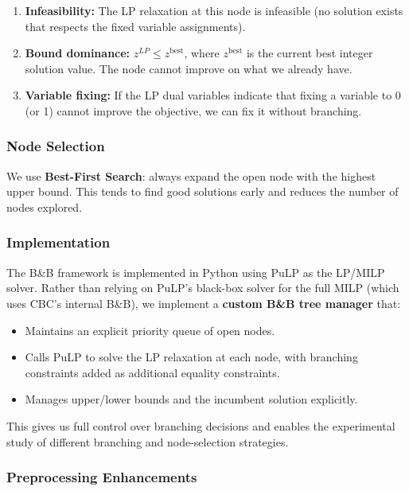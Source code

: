 \documentclass[12pt,a4paper]{article}
\begin{document}
\begin{enumerate}
  \item \textbf{Infeasibility:} The LP relaxation at this node is infeasible (no
  solution exists that respects the fixed variable assignments).
  \item \textbf{Bound dominance:} $z^{LP} \leq z^{\text{best}}$, where
  $z^{\text{best}}$ is the current best integer solution value. The node cannot improve
  on what we already have.
  \item \textbf{Variable fixing:} If the LP dual variables indicate that fixing a
  variable to 0 (or 1) cannot improve the objective, we can fix it without branching.
\end{enumerate}

\subsubsection{Node Selection}

We use \textbf{Best-First Search}: always expand the open node with the highest upper
bound. This tends to find good solutions early and reduces the number of nodes explored.

\subsubsection{Implementation}

The B\&B framework is implemented in Python using PuLP as the LP/MILP solver. Rather
than relying on PuLP's black-box solver for the full MILP (which uses CBC's internal
B\&B), we implement a \textbf{custom B\&B tree manager} that:
\begin{itemize}
  \item Maintains an explicit priority queue of open nodes.
  \item Calls PuLP to solve the LP relaxation at each node, with branching constraints
  added as additional equality constraints.
  \item Manages upper/lower bounds and the incumbent solution explicitly.
\end{itemize}

This gives us full control over branching decisions and enables the experimental study
of different branching and node-selection strategies.

\subsubsection{Preprocessing Enhancements}
\end{document}
